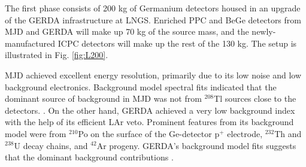 The first phase consists of 200 kg of Germanium detectors housed in an upgrade of the GERDA infrastructure at LNGS. Enriched PPC and BeGe detectors from MJD and GERDA will make up 70 kg of the source mass, and the newly-manufactured ICPC detectors will make up the rest of the 130 kg. The setup is illustrated in Fig. \ref{fig:L200}.

MJD achieved excellent energy resolution, primarily due to its low noise and low background electronics. Background model spectral fits indicated that the dominant source of background in MJD was not from $^{208}$Tl sources close to the detectors. \cite{Buuck_thesis}. On the other hand, GERDA achieved a very low background index with the help of its efficient LAr veto. Prominent features from its background model were from $^{210}$Po on the surface of the Ge-detector p$^+$ electrode, $^{232}$Th and $^{238}$U decay chains, and $^{42}$Ar progeny. GERDA's background model fits suggests that the dominant background contributions \cite{GERDA_final}.

